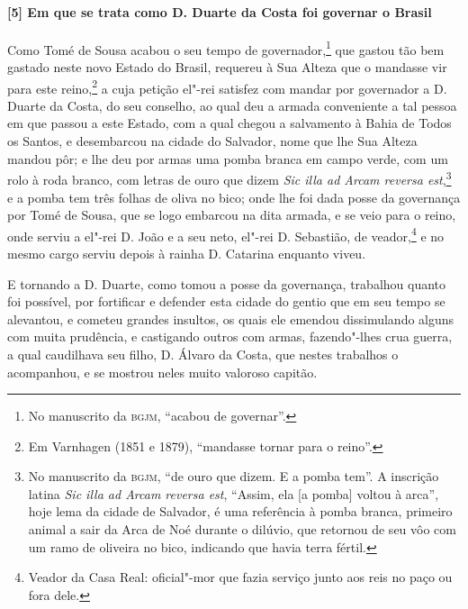 \paragraph{[5] Em que se trata como D. Duarte da Costa foi governar o Brasil} \quad
Como Tomé de Sousa acabou o seu tempo de governador,\footnote{ No manuscrito da
\textsc{bgjm}, ``acabou de governar''.} que gastou tão bem gastado neste novo Estado do
Brasil, requereu à Sua Alteza que o mandasse vir para este reino,\footnote{ Em Varnhagen
(1851 e 1879), ``mandasse tornar para o reino''.} a cuja petição el"-rei satisfez com
mandar por governador a D. Duarte da Costa, do seu conselho, ao qual deu a armada
conveniente a tal pessoa em que passou a este Estado, com a qual chegou a salvamento à
Bahia de Todos os Santos, e desembarcou na cidade do Salvador, nome que lhe Sua Alteza
mandou pôr; e lhe deu por armas uma pomba branca em campo verde, com um rolo à roda
branco, com letras de ouro que dizem \textit{Sic illa ad Arcam reversa est},\footnote{ No
manuscrito da \textsc{bgjm}, ``de ouro que dizem. E a pomba tem''. A inscrição latina
\textit{Sic illa ad Arcam reversa est}, ``Assim, ela [a pomba] voltou à arca'', hoje lema
da cidade de Salvador, é uma referência à pomba branca, primeiro animal a sair da Arca de
Noé durante o dilúvio, que retornou de seu vôo com um ramo de oliveira no bico, indicando
que havia terra fértil. } e a pomba tem três folhas de oliva no bico; onde lhe foi dada
posse da governança por Tomé de Sousa, que se logo embarcou na dita armada, e se veio para
o reino, onde serviu a el"-rei D. João e a seu neto, el"-rei D. Sebastião, de
veador,\footnote{ Veador da Casa Real: oficial"-mor que fazia serviço junto aos reis no paço
ou fora dele.} e no mesmo cargo serviu depois à rainha D. Catarina enquanto viveu.

E tornando a D. Duarte, como tomou a posse da governança, trabalhou quanto foi possível,
por fortificar e defender esta cidade do gentio que em seu tempo se alevantou, e cometeu
grandes insultos, os quais ele emendou dissimulando alguns com muita prudência, e
castigando outros com armas, fazendo"-lhes crua guerra, a qual caudilhava seu filho, D.
Álvaro da Costa, que nestes trabalhos o acompanhou, e se mostrou neles muito valoroso
capitão.

